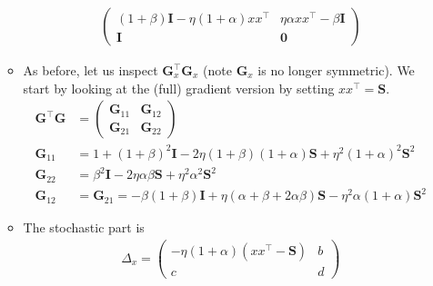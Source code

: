 \documentclass{article}
\newcommand{\mI}{{\mathbf I}}
\newcommand{\mS}{{\mathbf S}}
\newcommand{\mG}{{\mathbf G}}
\begin{document}
\begin{enumerate}
\begin{itemize}
\begin{align}
\begin{pmatrix}
	(1+\beta) \mI - \eta (1+\alpha)  xx^\top & \eta \alpha x x^\top - \beta \mI 
	\\
	\mI & \mathbf 0
\end{pmatrix}
\end{align}
\item As before, let us inspect $\mG_x^\top \mG_x$ (note $\mG_x$ is no longer symmetric). We start by looking at the (full) gradient version by setting $xx^\top = \mS$.
\begin{align}
\mG^\top \mG & =   \begin{pmatrix}
\mG_{11} & \mG_{12} \\
\mG_{21} & \mG_{22} 
\end{pmatrix} \\
\mG_{11} & = 1 + (1+\beta)^2 \mI -2 \eta (1+\beta)(1+\alpha)  \mS + \eta^2 (1+\alpha)^2 \mS^2 \\
\mG_{22} & = \beta^2 \mI -2 \eta \alpha \beta \mS + \eta^2\alpha^2 \mS^2 \\  
\mG_{12} & = \mG_{21} = - \beta(1+\beta) \mI +  \eta(\alpha + \beta + 2\alpha \beta) \mS - \eta^2 \alpha (1+\alpha) \mS^2
\end{align}
\item 
The stochastic part is 
\begin{align}
\Delta_x = \begin{pmatrix}
-\eta (1+\alpha) (xx^\top -\mS) & b \\ c & d 
\end{pmatrix} \\
\end{align}
\end{itemize}

\end{enumerate}



\end{document}
